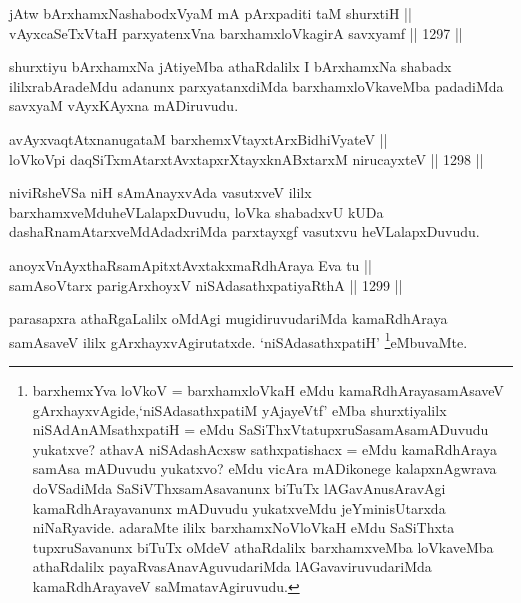 
\begin{shl}
jAtw bArxhamxNashabodxV\s yaM mA pArxpaditi taM shurxtiH || \\
vAyxcaSeTxV\s taH parxyatenxVna barxhamxloVkagirA savxyamf \hfill || 1297 ||  
\end{shl}

\begin{artha}
shurxtiyu bArxhamxNa jAtiyeMba athaRdalilx I bArxhamxNa shabadx ililxrabAradeMdu adanunx parxyatanxdiMda barxhamxloVkaveMba padadiMda savxyaM vAyxKAyxna mADiruvudu.
\end{artha}


\begin{shl}
avAyxvaqtAtxnanugataM barxhemxVtayxtArxBidhiVyateV || \\
loVkoV\s pi daqSiTxmAtarxtAvxtapxrXtayxknABxtarxM nirucayxteV \hfill || 1298 ||  
\end{shl}

\begin{artha}
niviRsheVSa niH sAmAnayxvAda vasutxveV ililx barxhamxveMduheVLalapxDuvudu, loVka shabadxvU kUDa dashaRnamAtarxveMdAdadxriMda parxtayxgf vasutxvu heVLalapxDuvudu.
\end{artha}


\begin{shl}
anoyxVnAyxthaRsamApitxtAvxtakxmaRdhAraya Eva tu || \\
samAsoV\s tarx parigArxhoyxV niSAdasathxpatiyaRthA \hfill || 1299 ||  
\end{shl}

\begin{artha}
parasapxra athaRgaLalilx oMdAgi mugidiruvudariMda kamaRdhAraya samAsaveV ililx gArxhayxvAgirutatxde. `niSAdasathxpatiH' \footnote{barxhemxYva loVkoV = barxhamxloVkaH eMdu kamaRdhArayasamAsaveV gArxhayxvAgide,\break `niSAdasathxpatiM yAjayeVtf' eMba shurxtiyalilx niSAdAnAMsathxpatiH = eMdu SaSiThxVtatupxruSasamAsamADuvudu yukatxve? athavA niSAdashAcxsw sathxpatishacx = eMdu kamaRdhAraya samAsa mADuvudu yukatxvo? eMdu vicAra mADikonege kalapxnAgwrava doVSadiMda SaSiVThxsamAsavanunx biTuTx lAGavAnusAravAgi kamaRdhArayavanunx mADuvudu yukatxveMdu jeYminisUtarxda niNaRyavide. adaraMte ililx barxhamxNoVloVkaH eMdu SaSiThxta tupxruSavanunx biTuTx oMdeV athaRdalilx barxhamxveMba loVkaveMba athaRdalilx payaRvasAnavAguvudariMda lAGavaviruvudariMda kamaRdhArayaveV saMmatavAgiruvudu.}eMbuvaMte.
\end{artha}

